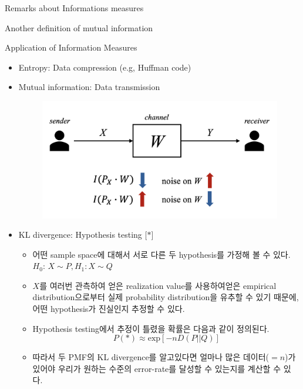 \documentclass[9pt]{beamer}
\begin{document}
\begin{section}{Remarks about Informations measures}
\begin{frame}{Another definition of mutual information}
        \end{frame}

        \begin{frame}{Application of Information Measures}
            \begin{itemize}
                \item Entropy: Data compression (e.g, Huffman code)
                \item Mutual information: Data transmission
                \begin{figure}
                    \includegraphics[width=0.55\columnwidth]{image/L2-transmission.png}
                \end{figure}
                \item KL divergence: Hypothesis testing [$\ast$]
                \begin{itemize}
                    \item 어떤 sample space에 대해서 서로 다른 두 hypothesis를 가정해 볼 수 있다.\\ $H_0$: $X \sim P, H_1: X \sim Q$
                    \item $X$를 여러번 관측하여 얻은 realization value를 사용하여얻은 empirical distribution으로부터 실제 probability distribution을 유추할 수 있기 때문에, 어떤 hypothesis가 진실인지 추정할 수 있다.
                    \item Hypothesis testing에서 추정이 틀렸을 확률은 다음과 같이 정의된다.
                    $$P(*) \approx \text{exp}[-n D(P||Q)]$$ 
                    \item 따라서 두 PMF의 KL divergence를 알고있다면 얼마나 많은 데이터($=n$)가 있어야 우리가 원하는 수준의 error-rate를 달성할 수 있는지를 계산할 수 있다.
                    
                \end{itemize}
            \end{itemize}
        \end{frame}
    \end{section}
\end{document}
